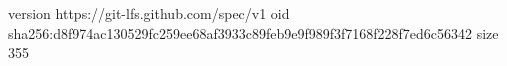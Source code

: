 version https://git-lfs.github.com/spec/v1
oid sha256:d8f974ac130529fc259ee68af3933c89feb9e9f989f3f7168f228f7ed6c56342
size 355
